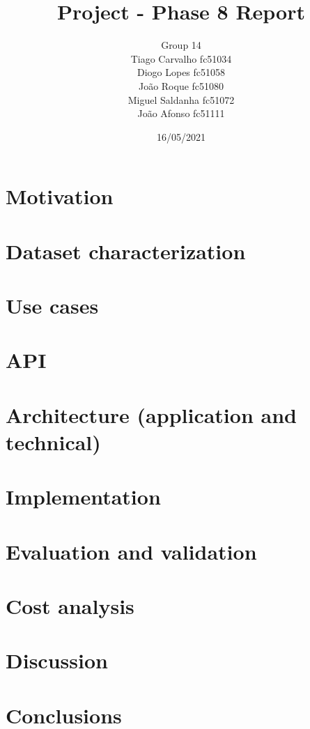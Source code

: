 \documentclass{article}
\title{Project - Phase 8 Report}
\author{Group 14 \\
Tiago Carvalho fc51034 \\
Diogo Lopes fc51058 \\
João Roque fc51080 \\
Miguel Saldanha fc51072 \\
João Afonso fc51111 \\
}
\date{16/05/2021}
\begin{document}
\maketitle

\section{Motivation}

\section{Dataset characterization}

\section{Use cases}

\section{API}

\section{Architecture (application and technical)}

\section{Implementation}

\section{Evaluation and validation}

\section{Cost analysis}

\section{Discussion}

\section{Conclusions}
\end{document}
